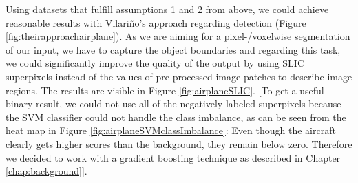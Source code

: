 Using datasets that fulfill assumptions 1 and 2 from above, we could achieve reasonable results with Vilari\~no's approach regarding detection (Figure \ref{fig:theirapproachairplane}). As we are aiming for a pixel-/voxelwise segmentation of our input, we have to capture the object boundaries and regarding this task, we could significantly improve the quality of the output by using SLIC superpixels  instead of the values of pre-processed image patches to describe image regions. 
The results are visible in Figure \ref{fig:airplaneSLIC}. [To get a useful binary result, we could not use all of the negatively labeled superpixels because the SVM classifier could not handle the class imbalance, as can be seen from the heat map in Figure \ref{fig:airplaneSVMclassImbalance}: Even though the aircraft clearly gets higher scores than the background, they remain below zero. Therefore we decided to work with a gradient boosting technique as described in Chapter \ref{chap:background}].

